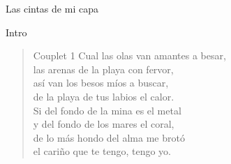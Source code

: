 \begin{song}{Las cintas de mi capa}

\begin{instrumental}{Intro}
  \measure{}  \measure{} \measure{} \\
  \measure{}  \measure{}  \measure{} 
\end{instrumental}

\begin{verse}{Couplet 1}
Cual las olas van amantes a besar,\\
las arenas de la playa con fervor,\\
así van los besos míos a buscar,\\
de la playa de tus labios el calor.\\
Si del fondo de la mina es el metal\\
y del fondo de los mares el coral,\\
de lo más hondo del alma me brotó\\
el cariño que te tengo, tengo yo.\hspace{2em}  \hspace{2em}\hspace{1em} 
\end{verse}


\end{song}
